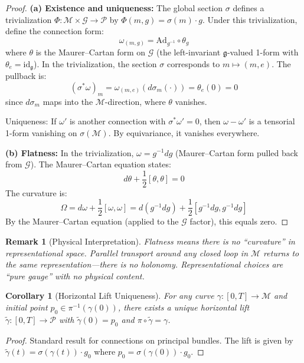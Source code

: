 \documentclass[11pt]{article}
\newtheorem{corollary}[theorem]{Corollary}
\newtheorem{remark}[theorem]{Remark}
\begin{document}
\begin{proof}
\textbf{(a) Existence and uniqueness:}
The global section $\sigma$ defines a trivialization $\Phi : \mathcal{M} \times \mathcal{G} \to \mathcal{P}$ by $\Phi(m, g) = \sigma(m) \cdot g$.
Under this trivialization, define the connection form:
\[
\omega_{(m,g)} = \mathrm{Ad}_{g^{-1}} \circ \theta_g
\]
where $\theta$ is the Maurer--Cartan form on $\mathcal{G}$ (the left-invariant $\mathfrak{g}$-valued 1-form with $\theta_e = \mathrm{id}_{\mathfrak{g}}$).
In the trivialization, the section $\sigma$ corresponds to $m \mapsto (m, e)$. The pullback is:
\[
(\sigma^* \omega)_m = \omega_{(m,e)}(d\sigma_m(\cdot)) = \theta_e(0) = 0
\]
since $d\sigma_m$ maps into the $\mathcal{M}$-direction, where $\theta$ vanishes.

Uniqueness: If $\omega'$ is another connection with $\sigma^* \omega' = 0$, then $\omega - \omega'$ is a tensorial 1-form
vanishing on $\sigma(\mathcal{M})$. By equivariance, it vanishes everywhere.

\textbf{(b) Flatness:}
In the trivialization, $\omega = g^{-1} dg$ (Maurer--Cartan form pulled back from $\mathcal{G}$). The Maurer--Cartan equation states:
\[
d\theta + \frac{1}{2}[\theta, \theta] = 0
\]
The curvature is:
\[
\Omega = d\omega + \frac{1}{2}[\omega, \omega] = d(g^{-1} dg) + \frac{1}{2}[g^{-1} dg, g^{-1} dg]
\]
By the Maurer--Cartan equation (applied to the $\mathcal{G}$ factor), this equals zero.
\end{proof}

\begin{remark}[Physical Interpretation]
Flatness means there is no ``curvature'' in representational space. Parallel transport around any closed loop in $\mathcal{M}$ returns to the same representation---there is no holonomy. Representational choices are ``pure gauge'' with no physical content.
\end{remark}

\begin{corollary}[Horizontal Lift Uniqueness]
For any curve $\gamma : [0, T] \to \mathcal{M}$ and initial point
$p_0 \in \pi^{-1}(\gamma(0))$, there exists a unique horizontal lift $\tilde{\gamma} : [0, T] \to \mathcal{P}$ with $\tilde{\gamma}(0) = p_0$ and $\pi \circ \tilde{\gamma} = \gamma$.
\end{corollary}

\begin{proof}
Standard result for connections on principal bundles. The lift is given by $\tilde{\gamma}(t) = \sigma(\gamma(t)) \cdot g_0$ where $p_0 = \sigma(\gamma(0)) \cdot g_0$.
\end{proof}
\end{document}
